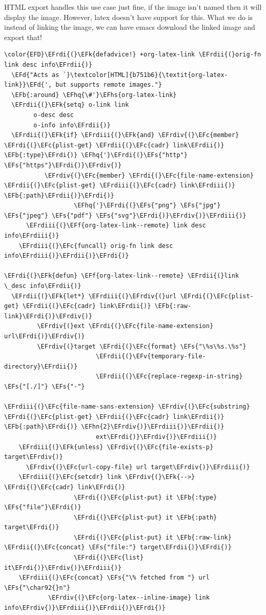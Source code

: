 \documentclass{scrartcl}
\newcommand{\EFk}[1]{\textcolor{EFk}{#1}} %
\newcommand{\EFd}[1]{\textcolor{EFd}{\textit{#1}}} %
\newcommand{\EFs}[1]{\textcolor{EFs}{#1}} %
\newcommand{\EFb}[1]{\textcolor{EFb}{#1}} %
\newcommand{\EFc}[1]{\textcolor{EFc}{#1}} %
\newcommand{\EFv}[1]{\textcolor{EFv}{#1}} %
\newcommand{\EFf}[1]{\textcolor{EFf}{#1}} %
\newcommand{\EFhn}[1]{\textcolor{EFhn}{\textbf{#1}}} %
\newcommand{\EFhq}[1]{\textcolor{EFhq}{#1}} %
\newcommand{\EFhs}[1]{\textcolor{EFhs}{#1}} %
\newcommand{\EFrdi}[1]{\textcolor{EFrdi}{#1}} %
\newcommand{\EFrdii}[1]{\textcolor{EFrdii}{#1}} %
\newcommand{\EFrdiii}[1]{\textcolor{EFrdiii}{#1}} %
\newcommand{\EFrdiv}[1]{\textcolor{EFrdiv}{#1}} %
\begin{document}
HTML export handles this use case just fine, if the image isn't named then it
will display the image. However, latex doesn't have support for this. What we do
is instead of linking the image, we can have emacs download the linked image and
export that!
\begin{Code}
\begin{Verbatim}[]
\color{EFD}\EFrdi{(}\EFk{defadvice!} +org-latex-link \EFrdii{(}orig-fn link desc info\EFrdii{)}
  \EFd{"Acts as `}\textcolor[HTML]{b751b6}{\textit{org-latex-link}}\EFd{', but supports remote images."}
  \EFb{:around} \EFhq{\#'}\EFhs{org-latex-link}
  \EFrdii{(}\EFk{setq} o-link link
        o-desc desc
        o-info info\EFrdii{)}
  \EFrdii{(}\EFk{if} \EFrdiii{(}\EFk{and} \EFrdiv{(}\EFc{member} \EFrdi{(}\EFc{plist-get} \EFrdii{(}\EFc{cadr} link\EFrdii{)} \EFb{:type}\EFrdi{)} \EFhq{'}\EFrdi{(}\EFs{"http"} \EFs{"https"}\EFrdi{)}\EFrdiv{)}
           \EFrdiv{(}\EFc{member} \EFrdi{(}\EFc{file-name-extension} \EFrdii{(}\EFc{plist-get} \EFrdiii{(}\EFc{cadr} link\EFrdiii{)} \EFb{:path}\EFrdii{)}\EFrdi{)}
                   \EFhq{'}\EFrdi{(}\EFs{"png"} \EFs{"jpg"} \EFs{"jpeg"} \EFs{"pdf"} \EFs{"svg"}\EFrdi{)}\EFrdiv{)}\EFrdiii{)}
      \EFrdiii{(}\EFf{org-latex-link--remote} link desc info\EFrdiii{)}
    \EFrdiii{(}\EFc{funcall} orig-fn link desc info\EFrdiii{)}\EFrdii{)}\EFrdi{)}

\EFrdi{(}\EFk{defun} \EFf{org-latex-link--remote} \EFrdii{(}link \_desc info\EFrdii{)}
  \EFrdii{(}\EFk{let*} \EFrdiii{(}\EFrdiv{(}url \EFrdi{(}\EFc{plist-get} \EFrdii{(}\EFc{cadr} link\EFrdii{)} \EFb{:raw-link}\EFrdi{)}\EFrdiv{)}
         \EFrdiv{(}ext \EFrdi{(}\EFc{file-name-extension} url\EFrdi{)}\EFrdiv{)}
         \EFrdiv{(}target \EFrdi{(}\EFc{format} \EFs{"\%s\%s.\%s"}
                         \EFrdii{(}\EFv{temporary-file-directory}\EFrdii{)}
                         \EFrdii{(}\EFc{replace-regexp-in-string} \EFs{"[./]"} \EFs{"-"}
                                                   \EFrdiii{(}\EFc{file-name-sans-extension} \EFrdiv{(}\EFc{substring} \EFrdi{(}\EFc{plist-get} \EFrdii{(}\EFc{cadr} link\EFrdii{)} \EFb{:path}\EFrdi{)} \EFhn{2}\EFrdiv{)}\EFrdiii{)}\EFrdii{)}
                         ext\EFrdi{)}\EFrdiv{)}\EFrdiii{)}
    \EFrdiii{(}\EFk{unless} \EFrdiv{(}\EFc{file-exists-p} target\EFrdiv{)}
      \EFrdiv{(}\EFc{url-copy-file} url target\EFrdiv{)}\EFrdiii{)}
    \EFrdiii{(}\EFc{setcdr} link \EFrdiv{(}\EFk{-->} \EFrdi{(}\EFc{cadr} link\EFrdi{)}
                   \EFrdi{(}\EFc{plist-put} it \EFb{:type} \EFs{"file"}\EFrdi{)}
                   \EFrdi{(}\EFc{plist-put} it \EFb{:path} target\EFrdi{)}
                   \EFrdi{(}\EFc{plist-put} it \EFb{:raw-link} \EFrdii{(}\EFc{concat} \EFs{"file:"} target\EFrdii{)}\EFrdi{)}
                   \EFrdi{(}\EFc{list} it\EFrdi{)}\EFrdiv{)}\EFrdiii{)}
    \EFrdiii{(}\EFc{concat} \EFs{"\% fetched from "} url \EFs{"\char92{}n"}
            \EFrdiv{(}\EFc{org-latex--inline-image} link info\EFrdiv{)}\EFrdiii{)}\EFrdii{)}\EFrdi{)}
\end{Verbatim}
\end{Code}
\end{document}
